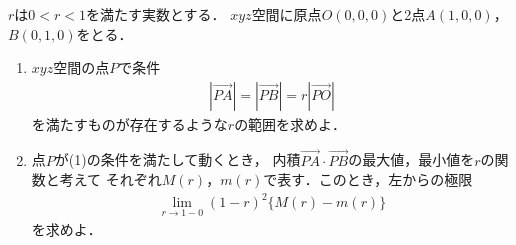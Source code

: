 \documentclass[../../main.tex]{subfiles}
\begin{document}
$r$は$0<r<1$を満たす実数とする．
$xyz$空間に原点$O(0,0,0)$と2点$A(1,0,0)$，$B(0,1,0)$をとる．
\begin{enumerate}
  \item $xyz$空間の点$P$で条件
    \begin{align*}
      |\overrightarrow{PA}|=|\overrightarrow{PB}|=r|\overrightarrow{PO}|
    \end{align*}
    を満たすものが存在するような$r$の範囲を求めよ．
  \item 点$P$が(1)の条件を満たして動くとき，
    内積$\overrightarrow{PA}\cdot\overrightarrow{PB}$の最大値，最小値を$r$の関数と考えて
    それぞれ$M(r)$，$m(r)$で表す．このとき，左からの極限
    \begin{align*}
      \lim_{r\to1-0}{(1-r)}^2\{M(r)-m(r)\}
    \end{align*}
    を求めよ．
\end{enumerate}
\end{document}
